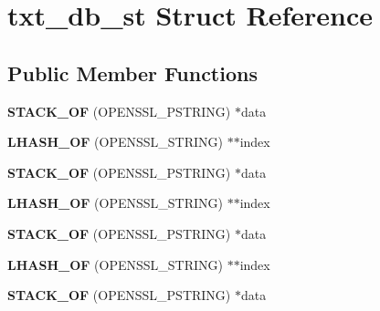 \hypertarget{structtxt__db__st}{}\section{txt\+\_\+db\+\_\+st Struct Reference}
\label{structtxt__db__st}
\subsection*{Public Member Functions}
\begin{DoxyCompactItemize}
\item 
\mbox{\label{structtxt__db__st_a41f7b73f92447ce98883e1449815a50b}} 
{\bfseries S\+T\+A\+C\+K\+\_\+\+OF} (O\+P\+E\+N\+S\+S\+L\+\_\+\+P\+S\+T\+R\+I\+NG) $\ast$data
\item 
\mbox{\label{structtxt__db__st_acbdb24082dd01585b01e1538253bf622}} 
{\bfseries L\+H\+A\+S\+H\+\_\+\+OF} (O\+P\+E\+N\+S\+S\+L\+\_\+\+S\+T\+R\+I\+NG) $\ast$$\ast$index
\item 
\mbox{\label{structtxt__db__st_a41f7b73f92447ce98883e1449815a50b}} 
{\bfseries S\+T\+A\+C\+K\+\_\+\+OF} (O\+P\+E\+N\+S\+S\+L\+\_\+\+P\+S\+T\+R\+I\+NG) $\ast$data
\item 
\mbox{\label{structtxt__db__st_acbdb24082dd01585b01e1538253bf622}} 
{\bfseries L\+H\+A\+S\+H\+\_\+\+OF} (O\+P\+E\+N\+S\+S\+L\+\_\+\+S\+T\+R\+I\+NG) $\ast$$\ast$index
\item 
\mbox{\label{structtxt__db__st_a41f7b73f92447ce98883e1449815a50b}} 
{\bfseries S\+T\+A\+C\+K\+\_\+\+OF} (O\+P\+E\+N\+S\+S\+L\+\_\+\+P\+S\+T\+R\+I\+NG) $\ast$data
\item 
\mbox{\label{structtxt__db__st_acbdb24082dd01585b01e1538253bf622}} 
{\bfseries L\+H\+A\+S\+H\+\_\+\+OF} (O\+P\+E\+N\+S\+S\+L\+\_\+\+S\+T\+R\+I\+NG) $\ast$$\ast$index
\item 
\mbox{\label{structtxt__db__st_a41f7b73f92447ce98883e1449815a50b}} 
{\bfseries S\+T\+A\+C\+K\+\_\+\+OF} (O\+P\+E\+N\+S\+S\+L\+\_\+\+P\+S\+T\+R\+I\+NG) $\ast$data
\item 
\mbox{\label{structtxt__db__st_acbdb24082dd01585b01e1538253bf622}} 
$$
\end{DoxyCompactItemize}

